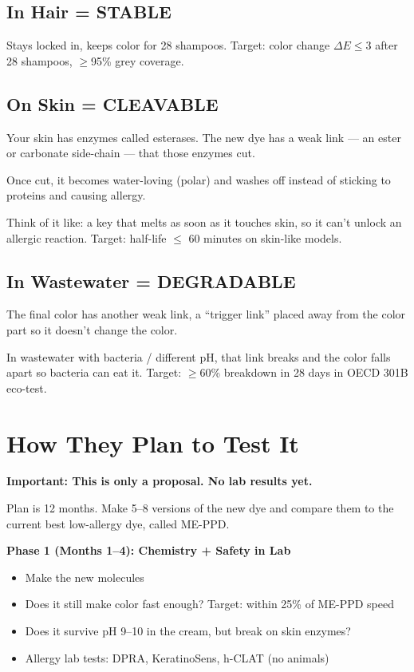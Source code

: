 \documentclass[11pt,a4paper]{article}
\begin{document}
\subsection*{In Hair = STABLE}
Stays locked in, keeps color for 28 shampoos. Target: color change $\Delta E \leq 3$ after 28 shampoos, $\geq$95\% grey coverage.

\subsection*{On Skin = CLEAVABLE}
Your skin has enzymes called esterases. The new dye has a weak link --- an ester or carbonate side-chain --- that those enzymes cut.

Once cut, it becomes water-loving (polar) and washes off instead of sticking to proteins and causing allergy.

Think of it like: a key that melts as soon as it touches skin, so it can't unlock an allergic reaction. Target: half-life $\leq$ 60 minutes on skin-like models.

\subsection*{In Wastewater = DEGRADABLE}
The final color has another weak link, a ``trigger link'' placed away from the color part so it doesn't change the color.

In wastewater with bacteria / different pH, that link breaks and the color falls apart so bacteria can eat it. Target: $\geq$60\% breakdown in 28 days in OECD 301B eco-test.

\section{How They Plan to Test It}
\textbf{Important: This is only a proposal. No lab results yet.}

Plan is 12 months. Make 5--8 versions of the new dye and compare them to the current best low-allergy dye, called ME-PPD.

\textbf{Phase 1 (Months 1--4): Chemistry + Safety in Lab}
\begin{itemize}[leftmargin=1.5em]
\item Make the new molecules
\item Does it still make color fast enough? Target: within 25\% of ME-PPD speed
\item Does it survive pH 9--10 in the cream, but break on skin enzymes?
\item Allergy lab tests: DPRA, KeratinoSens, h-CLAT (no animals)
\end{itemize}
\end{document}

